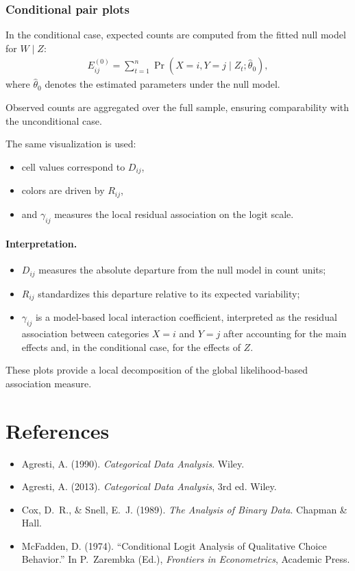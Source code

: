 \documentclass[11pt,a4paper]{article}
\begin{document}
\subsubsection*{Conditional pair plots}

In the conditional case, expected counts are computed from the fitted null model for $W\mid Z$:
\begin{align}
E^{(0)}_{ij}
=
\sum_{t=1}^n
\Pr(X=i,Y=j \mid Z_t;\widehat{\theta}_0),
\end{align}
where $\widehat{\theta}_0$ denotes the estimated parameters under the null model.

Observed counts are aggregated over the full sample, ensuring comparability with the unconditional case.

The same visualization is used:
\begin{itemize}
\item cell values correspond to $D_{ij}$,
\item colors are driven by $R_{ij}$,
\item and $\gamma_{ij}$ measures the local residual association on the logit scale.
\end{itemize}

\paragraph{Interpretation.}
\begin{itemize}
\item $D_{ij}$ measures the absolute departure from the null model in count units;
\item $R_{ij}$ standardizes this departure relative to its expected variability;
\item $\gamma_{ij}$ is a model-based local interaction coefficient, interpreted as the residual association between categories $X=i$ and $Y=j$ after accounting for the main effects and, in the conditional case, for the effects of $Z$.
\end{itemize}

These plots provide a local decomposition of the global likelihood-based association measure.

\section*{References}

\begin{itemize}
  \item Agresti, A. (1990). \emph{Categorical Data Analysis}. Wiley.
  \item Agresti, A. (2013). \emph{Categorical Data Analysis}, 3rd ed. Wiley.
  \item Cox, D.~R., \& Snell, E.~J. (1989). \emph{The Analysis of Binary Data}. Chapman \& Hall.
  \item McFadden, D. (1974). ``Conditional Logit Analysis of Qualitative Choice Behavior.'' In P.~Zarembka (Ed.), \emph{Frontiers in Econometrics}, Academic Press.
\end{itemize}
\end{document}
